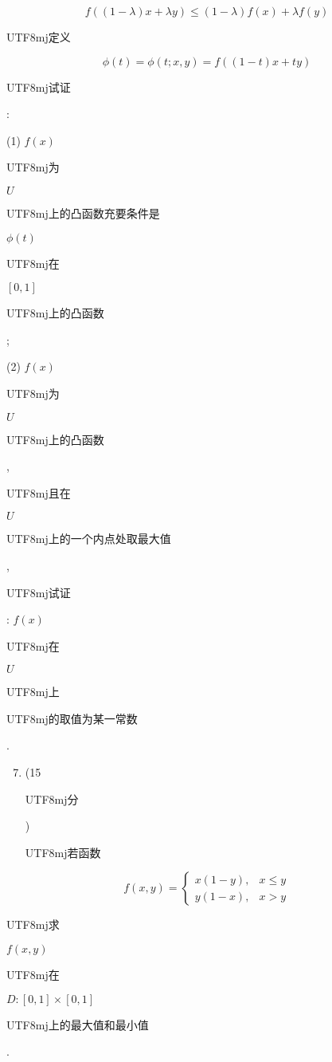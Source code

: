 \documentclass[10pt]{article}
\begin{document}
$$
f((1-\lambda) x+\lambda y) \leqslant(1-\lambda) f(x)+\lambda f(y)
$$
\begin{CJK}{UTF8}{mj}定义\end{CJK}
$$
\phi(t)=\phi(t ; x, y)=f((1-t) x+t y)
$$
\begin{CJK}{UTF8}{mj}试证\end{CJK}:

(1) $f(x)$ \begin{CJK}{UTF8}{mj}为\end{CJK} $U$ \begin{CJK}{UTF8}{mj}上的凸函数充要条件是\end{CJK} $\phi(t)$ \begin{CJK}{UTF8}{mj}在\end{CJK} $[0,1]$ \begin{CJK}{UTF8}{mj}上的凸函数\end{CJK};

(2) $f(x)$ \begin{CJK}{UTF8}{mj}为\end{CJK} $U$ \begin{CJK}{UTF8}{mj}上的凸函数\end{CJK}, \begin{CJK}{UTF8}{mj}且在\end{CJK} $U$ \begin{CJK}{UTF8}{mj}上的一个内点处取最大值\end{CJK}, \begin{CJK}{UTF8}{mj}试证\end{CJK}: $f(x)$ \begin{CJK}{UTF8}{mj}在\end{CJK} $U$ \begin{CJK}{UTF8}{mj}上\end{CJK} \begin{CJK}{UTF8}{mj}的取值为某一常数\end{CJK}.

\begin{enumerate}
  \setcounter{enumi}{6}
  \item (15 \begin{CJK}{UTF8}{mj}分\end{CJK}) \begin{CJK}{UTF8}{mj}若函数\end{CJK}
\end{enumerate}
$$
f(x, y)= \begin{cases}x(1-y), & x \leqslant y \\ y(1-x), & x>y\end{cases}
$$
\begin{CJK}{UTF8}{mj}求\end{CJK} $f(x, y)$ \begin{CJK}{UTF8}{mj}在\end{CJK} $D:[0,1] \times[0,1]$ \begin{CJK}{UTF8}{mj}上的最大值和最小值\end{CJK}.
\end{document}
